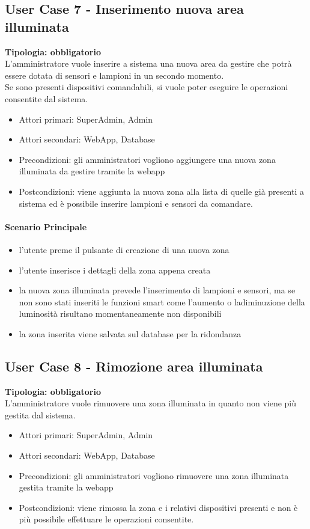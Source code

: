 \documentclass[12pt]{article}
\begin{document}
\subsection{User Case 7 - Inserimento nuova area illuminata}
\textbf{Tipologia: obbligatorio} \\
L'amministratore vuole inserire a sistema una nuova area da gestire che potrà essere dotata di sensori e lampioni in un secondo momento.\\
Se sono presenti dispositivi comandabili, si vuole poter eseguire le operazioni consentite dal sistema.
\begin{itemize}
	\item Attori primari: SuperAdmin, Admin
	\item Attori secondari: WebApp, Database
	\item Precondizioni: gli amministratori vogliono aggiungere una nuova zona illuminata da gestire tramite la webapp
	\item Postcondizioni: viene aggiunta la nuova zona alla lista di quelle già presenti a sistema ed è possibile inserire lampioni e sensori da comandare.
\end{itemize}
\paragraph{Scenario Principale}
\begin{itemize}
	\item l'utente preme il pulsante di creazione di una nuova zona
	\item l'utente inserisce i dettagli della zona appena creata
	\item la nuova zona illuminata prevede l'inserimento di lampioni e sensori, ma se non sono stati inseriti le funzioni smart come l'aumento o ladiminuzione della luminosità risultano momentaneamente non disponibili
	\item la zona inserita viene salvata sul database per la ridondanza
\end{itemize}

\subsection{User Case 8 - Rimozione area illuminata}
\textbf{Tipologia: obbligatorio} \\
L'amministratore vuole rimuovere una zona illuminata in quanto non viene più gestita dal sistema.
\begin{itemize}
	\item Attori primari: SuperAdmin, Admin
	\item Attori secondari: WebApp, Database
	\item Precondizioni: gli amministratori vogliono rimuovere una zona illuminata gestita tramite la webapp
	\item Postcondizioni: viene rimossa la zona e i relativi dispositivi presenti e non è più possibile effettuare le operazioni consentite.
\end{itemize}
\end{document}

